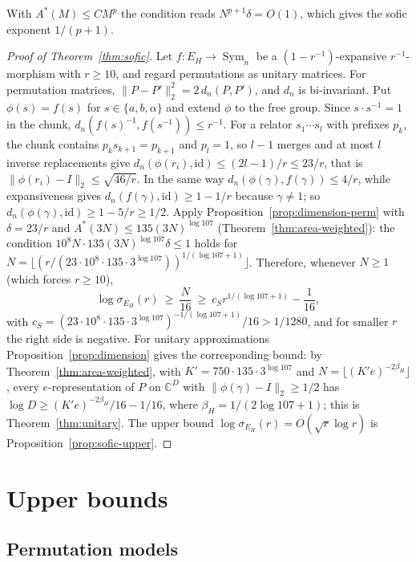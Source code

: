 \documentclass[11pt,a4paper]{article}
\theoremstyle{plain}
\theoremstyle{definition}
\theoremstyle{remark}
\DeclareMathOperator{\Sym}{Sym}
\begin{document}
With $A^*(M)\le CM^p$ the condition reads $N^{p+1}\delta=O(1)$, which gives the sofic exponent $1/(p+1)$.

\begin{proof}[Proof of Theorem~\ref{thm:sofic}]
Let $f:E_H\to\Sym_n$ be a $(1-r^{-1})$-expansive $r^{-1}$-morphism with $r\ge10$, and regard permutations as unitary matrices.
For permutation matrices, $\|P-P'\|_2^2=2\,d_n(P,P')$, and $d_n$ is bi-invariant. Put $\phi(s)=f(s)$ for $s\in\{a,b,\alpha\}$
and extend $\phi$ to the free group. Since $s\cdot s^{-1}=1$ in the chunk, $d_n(f(s)^{-1},f(s^{-1}))\le r^{-1}$. For a relator
$s_1\cdots s_l$ with prefixes $p_k$, the chunk contains $p_ks_{k+1}=p_{k+1}$ and $p_l=1$, so $l-1$ merges and at most $l$
inverse replacements give $d_n(\phi(r_i),\mathrm{id})\le(2l-1)/r\le23/r$, that is $\|\phi(r_i)-I\|_2\le\sqrt{46/r}$. In the
same way $d_n(\phi(\gamma),f(\gamma))\le4/r$, while expansiveness gives $d_n(f(\gamma),\mathrm{id})\ge1-1/r$ because $\gamma\ne1$;
so $d_n(\phi(\gamma),\mathrm{id})\ge1-5/r\ge1/2$. Apply Proposition~\ref{prop:dimension-perm} with $\delta=23/r$ and
$A^*(3N)\le135(3N)^{\log107}$ (Theorem~\ref{thm:area-weighted}): the condition $10^8N\cdot135(3N)^{\log107}\delta\le1$ holds for
$N=\lfloor(r/(23\cdot10^8\cdot135\cdot3^{\log107}))^{1/(\log107+1)}\rfloor$. Therefore, whenever $N\ge1$ (which forces $r\ge10$),
\[
\log\sigma_{E_H}(r)\ \ge\ \frac N{16}\ \ge\ c_Sr^{1/(\log107+1)}-\frac1{16},
\]
with $c_S=(23\cdot10^8\cdot135\cdot3^{\log107})^{-1/(\log107+1)}/16>1/1280$,
and for smaller $r$ the right side is negative. For unitary approximations Proposition~\ref{prop:dimension} gives the
corresponding bound: by Theorem~\ref{thm:area-weighted}, with $K'=750\cdot135\cdot3^{\log107}$ and $N=\lfloor(K'e)^{-2\beta_H}\rfloor$, every
$e$-representation of $P$ on $\mathbb C^D$ with $\|\phi(\gamma)-I\|_2\ge1/2$ has $\log D\ge(K'e)^{-2\beta_H}/16-1/16$, where
$\beta_H=1/(2\log107+1)$; this is Theorem~\ref{thm:unitary}. The upper bound
$\log\sigma_{E_H}(r)=O(\sqrt r\log r)$ is Proposition~\ref{prop:sofic-upper}.
\end{proof}

\section{Upper bounds}\label{sec:corner}

\subsection{Permutation models}
\end{document}
